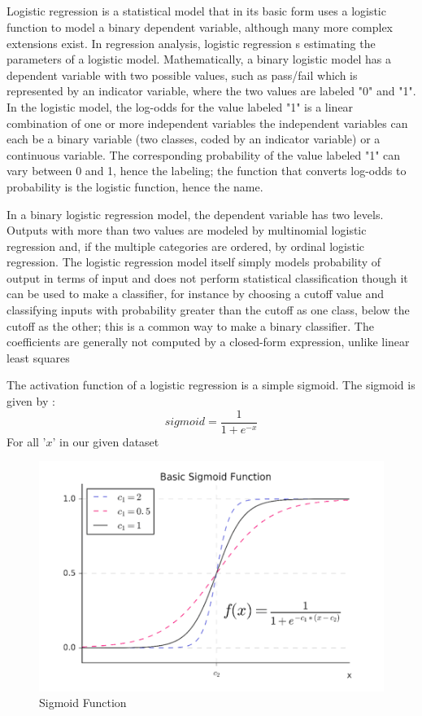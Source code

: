\documentclass[12pt]{article}
\newcommand{\msize}{\fontsize{14pt}{12pt}\selectfont}
\begin{document}
\subsection{\msize{\textbf{LOGISTIC REGRESSION}}}
Logistic regression is a statistical model that in its basic form uses a logistic function to model a binary dependent variable, although many more complex extensions exist. In regression analysis, logistic regression s estimating the parameters of a logistic model. Mathematically, a binary logistic model has a dependent variable with two possible values, such as pass/fail which is represented by an indicator variable, where the two values are labeled "0" and "1". In the logistic model, the log-odds  for the value labeled "1" is a linear combination of one or more independent variables the independent variables can each be a binary variable (two classes, coded by an indicator variable) or a continuous variable. The corresponding probability of the value labeled "1" can vary between 0 and 1, hence the labeling; the function that converts log-odds to probability is the logistic function, hence the name.

In a binary logistic regression model, the dependent variable has two levels. Outputs with more than two values are modeled by multinomial logistic regression and, if the multiple categories are ordered, by ordinal logistic regression. The logistic regression model itself simply models probability of output in terms of input and does not perform statistical classification though it can be used to make a classifier, for instance by choosing a cutoff value and classifying inputs with probability greater than the cutoff as one class, below the cutoff as the other; this is a common way to make a binary classifier. The coefficients are generally not computed by a closed-form expression, unlike linear least squares

The activation function of a logistic regression is a simple sigmoid. The sigmoid is given by : 
\begin{equation*} 
sigmoid= \frac{1}{1+e^{-x}}
\end{equation*}
For all '$x$' in our given dataset 

\begin{center}
\begin{figure}[h]
\centerline{\includegraphics[scale=.7]{IMG_8204.png}}
\caption{Sigmoid Function}
\end{figure}
\end{center}
\end{document}
